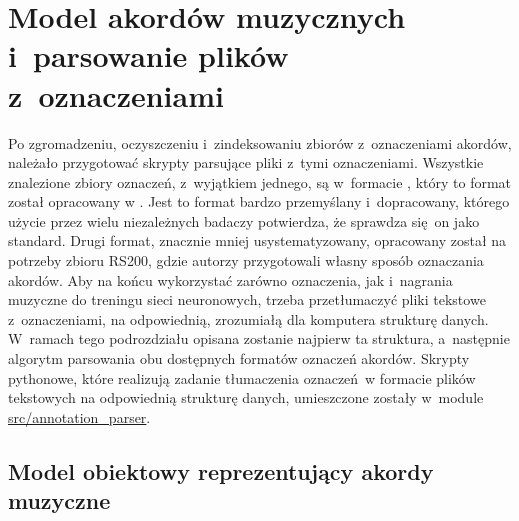 \section{Model akordów muzycznych i~parsowanie plików z~oznaczeniami} \label{section:chord_model}

Po zgromadzeniu, oczyszczeniu i~zindeksowaniu zbiorów z~oznaczeniami akordów, należało przygotować skrypty parsujące pliki z~tymi oznaczeniami. Wszystkie znalezione zbiory oznaczeń, z~wyjątkiem jednego, są w~formacie , który to format został opracowany w \cite{harte_towards_nodate}.  Jest to format bardzo przemyślany i~dopracowany, którego użycie przez wielu niezależnych badaczy potwierdza, że sprawdza się on jako standard. Drugi format, znacznie mniej usystematyzowany, opracowany został na potrzeby zbioru RS200, gdzie autorzy przygotowali własny sposób oznaczania akordów. Aby na końcu wykorzystać zarówno oznaczenia, jak i~nagrania muzyczne do treningu sieci neuronowych, trzeba przetłumaczyć pliki tekstowe z~oznaczeniami, na odpowiednią, zrozumiałą dla komputera strukturę danych. W~ramach tego podrozdziału opisana zostanie najpierw ta struktura, a~następnie algorytm parsowania obu dostępnych formatów oznaczeń akordów. Skrypty pythonowe, które realizują zadanie tłumaczenia oznaczeń w formacie plików tekstowych na odpowiednią strukturę danych, umieszczone zostały w~module \url{src/annotation_parser}.

\subsection{Model obiektowy reprezentujący akordy muzyczne} \label{subsection:chord_model}

